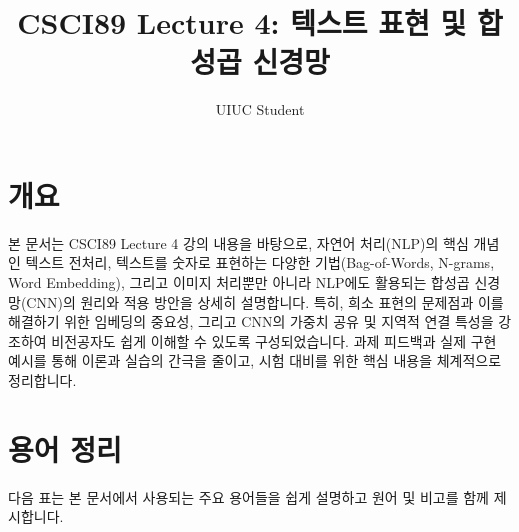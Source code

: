 \documentclass[11pt,a4paper]{article}
\title{\textbf{CSCI89 Lecture 4: 텍스트 표현 및 합성곱 신경망}}
\author{UIUC Student}
\date{}
\begin{document}
\maketitle
\thispagestyle{fancy} %

\newpage
\section*{개요}

\begin{summarybox}
본 문서는 CSCI89 Lecture 4 강의 내용을 바탕으로, 자연어 처리(NLP)의 핵심 개념인 텍스트 전처리, 텍스트를 숫자로 표현하는 다양한 기법(Bag-of-Words, N-grams, Word Embedding), 그리고 이미지 처리뿐만 아니라 NLP에도 활용되는 합성곱 신경망(CNN)의 원리와 적용 방안을 상세히 설명합니다. 특히, 희소 표현의 문제점과 이를 해결하기 위한 임베딩의 중요성, 그리고 CNN의 가중치 공유 및 지역적 연결 특성을 강조하여 비전공자도 쉽게 이해할 수 있도록 구성되었습니다. 과제 피드백과 실제 구현 예시를 통해 이론과 실습의 간극을 줄이고, 시험 대비를 위한 핵심 내용을 체계적으로 정리합니다.
\end{summarybox}

\newpage
\section*{용어 정리}

다음 표는 본 문서에서 사용되는 주요 용어들을 쉽게 설명하고 원어 및 비고를 함께 제시합니다.
\end{document}
